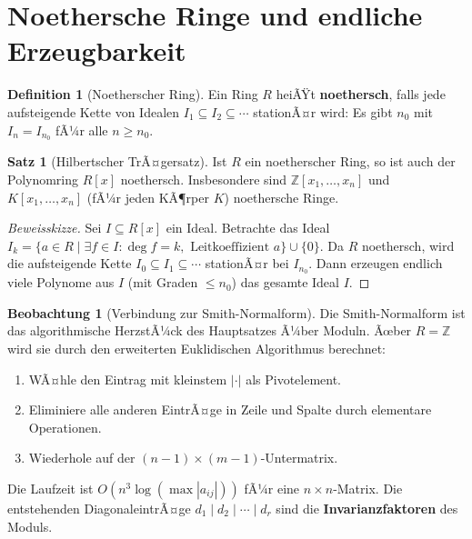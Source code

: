 ﻿\documentclass[a4paper,12pt]{report}
\theoremstyle{definition}
\newtheorem{definition}{Definition}
\newtheorem{satz}{Satz}
\newtheorem{beobachtung}{Beobachtung}
\begin{document}
\section{Noethersche Ringe und endliche Erzeugbarkeit}

\begin{definition}[Noetherscher Ring]
    Ein Ring $R$ heiÃŸt \textbf{noethersch}, falls jede aufsteigende
    Kette von Idealen $I_1 \subseteq I_2 \subseteq \cdots$ stationÃ¤r
    wird: Es gibt $n_0$ mit $I_n = I_{n_0}$ fÃ¼r alle $n \geq n_0$.
\end{definition}

\begin{satz}[Hilbertscher TrÃ¤gersatz]
    Ist $R$ ein noetherscher Ring, so ist auch der Polynomring $R[x]$
    noethersch. Insbesondere sind $\mathbb{Z}[x_1, \ldots, x_n]$ und
    $K[x_1, \ldots, x_n]$ (fÃ¼r jeden KÃ¶rper $K$) noethersche Ringe.
\end{satz}
\begin{proof}[Beweisskizze]
    Sei $I \subseteq R[x]$ ein Ideal. Betrachte das Ideal
    $I_k = \{a \in R \mid \exists f \in I : \deg f = k, \text{ Leitkoeffizient } a\}
    \cup \{0\}$. Da $R$ noethersch, wird die aufsteigende Kette
    $I_0 \subseteq I_1 \subseteq \cdots$ stationÃ¤r bei $I_{n_0}$.
    Dann erzeugen endlich viele Polynome aus $I$ (mit Graden $\leq n_0$)
    das gesamte Ideal $I$.
\end{proof}

\begin{beobachtung}[Verbindung zur Smith-Normalform]
    Die Smith-Normalform ist das algorithmische HerzstÃ¼ck des Hauptsatzes
    Ã¼ber Moduln. Ãœber $R = \mathbb{Z}$ wird sie durch den
    erweiterten Euklidischen Algorithmus berechnet:
    \begin{enumerate}
        \item WÃ¤hle den Eintrag mit kleinstem $|\cdot|$ als Pivotelement.
        \item Eliminiere alle anderen EintrÃ¤ge in Zeile und Spalte
              durch elementare Operationen.
        \item Wiederhole auf der $(n-1)\times(m-1)$-Untermatrix.
    \end{enumerate}
    Die Laufzeit ist $O(n^3 \log(\max|a_{ij}|))$ fÃ¼r eine $n \times n$-Matrix.
    Die entstehenden DiagonaleintrÃ¤ge $d_1 \mid d_2 \mid \cdots \mid d_r$
    sind die \textbf{Invarianzfaktoren} des Moduls.
\end{beobachtung}
\end{document}
